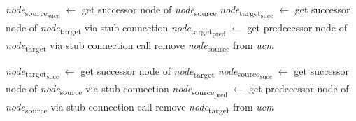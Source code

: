 \begin{algorithm}
\begin{algorithmic}[1]
		 \label{alg:2.11}
			\State \emph{node}\textsubscript{source\textsubscript{succ}} $\gets$ get successor node of \emph{node}\textsubscript{source}
			\State \emph{node}\textsubscript{target\textsubscript{succ}} $\gets$ get successor node of \emph{node}\textsubscript{target} via stub connection
			\State \emph{node}\textsubscript{target\textsubscript{pred}} $\gets$ get predecessor node of \emph{node}\textsubscript{target} via stub connection
			\State call 
			\State remove \emph{node}\textsubscript{source} from \emph{ucm}
		\EndFunction \label{alg:2.12}
		
		 \label{alg:2.13}
			\State \emph{node}\textsubscript{target\textsubscript{succ}} $\gets$ get successor node of \emph{node}\textsubscript{target}
			\State \emph{node}\textsubscript{source\textsubscript{succ}} $\gets$ get successor node of \emph{node}\textsubscript{source} via stub connection
			\State \emph{node}\textsubscript{source\textsubscript{pred}} $\gets$ get predecessor node of \emph{node}\textsubscript{source} via stub connection
			\State call 
			\State remove \emph{node}\textsubscript{target} from \emph{ucm}
		\EndFunction \label{alg:2.14}
		
	\end{algorithmic}
\end{algorithm}

